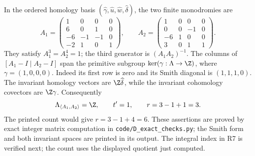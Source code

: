 \begin{example}
\label{st:D.1.3}
In the ordered homology basis
$(\widehat\gamma,\widehat u,\widehat w,\widehat\delta)$,
the two finite monodromies are
\[
A_1=\begin{pmatrix}1&0&0&0\\6&0&1&0\\-6&-1&-1&0\\-2&1&0&1\end{pmatrix},
\qquad
A_2=\begin{pmatrix}1&0&0&0\\0&0&-1&0\\-6&1&0&0\\3&0&1&1\end{pmatrix}.
\]
They satisfy $A_1^3=A_2^4=1$; the third generator is
$(A_1A_2)^{-1}$. The columns of
$[A_1-I\mid A_2-I]$ span the primitive subgroup
$\ker(\gamma:\Lambda\to\Z)$, where $\gamma=(1,0,0,0)$.
Indeed its first row is zero and its Smith diagonal is $(1,1,1,0)$.
The invariant homology vectors are $\Z\widehat\delta$, while the
invariant cohomology covectors are $\Z\gamma$. Consequently
\[
\Lambda_{\langle A_1,A_2\rangle}=\Z,
\qquad t'=1,
\qquad r=3-1+1=3.
\]
The printed count would give $r=3-1+4=6$.
These assertions are proved by exact integer matrix computation in
\texttt{code/D\_exact\_checks.py}; the Smith form and both invariant
spaces are printed in its output. The integral index in R7 is
verified next; the count uses the displayed quotient just computed.
\end{example}

